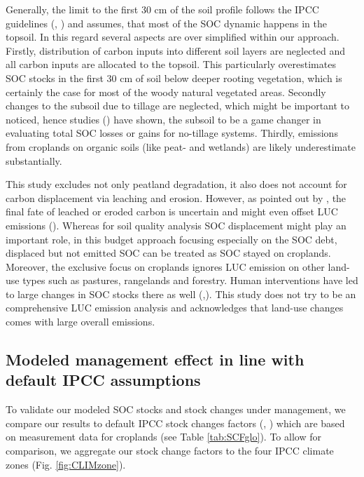 \documentclass[gc, manuscript]{copernicus}
\begin{document}
Generally, the limit to the first 30 cm of the soil profile follows the IPCC guidelines (\citep{eggleston_ipcc_2006}, \citep{calvo_buendia_ipcc_2019}) and assumes, that most of the SOC dynamic happens in the topsoil. In this regard several aspects are over simplified within our approach. Firstly, distribution of carbon inputs into different soil layers are neglected and all carbon inputs are allocated to the topsoil. This particularly overestimates SOC stocks in the first 30 cm of soil below deeper rooting vegetation, which is certainly the case for most of the woody natural vegetated areas. Secondly changes to the subsoil due to tillage are neglected, which might be important to noticed, hence studies (\citep{powlson_limited_2014}) have shown, the subsoil to be a game changer in evaluating total SOC losses or gains for no-tillage systems. Thirdly, emissions from croplands on organic soils (like peat- and wetlands) are likely underestimate substantially.

This study excludes not only peatland degradation, it also does not account for carbon displacement via leaching and erosion. However, as pointed out by \citep{doetterl_erosion_2016}, the final fate of leached or eroded carbon is uncertain and might even offset LUC emissions (\citep{wang_human-induced_2017}). Whereas for soil quality analysis SOC displacement might play an important role, in this budget approach focusing especially on the SOC debt, displaced but not emitted SOC can be treated as SOC stayed on croplands.
Moreover, the exclusive focus on croplands ignores LUC emission on other land-use types such as pastures, rangelands and forestry. Human interventions have led to large changes in SOC stocks there as well (\citep{sanderman_soil_2017},\citep{friedlingstein_global_2019}). This study does not try to be an comprehensive LUC emission analysis and acknowledges that land-use changes comes with large overall emissions.

\hypertarget{sec:ipcccompare}{%
\subsection{Modeled management effect in line with default IPCC assumptions}\label{sec:ipcccompare}}

To validate our modeled SOC stocks and stock changes under management, we compare our results to default IPCC stock changes factors (\citep{eggleston_ipcc_2006}, \citep{calvo_buendia_ipcc_2019}) which are based on measurement data for croplands (see Table \ref{tab:SCFglo}). To allow for comparison, we aggregate our stock change factors to the four IPCC climate zones (Fig. \ref{fig:CLIMzone}).
\end{document}

